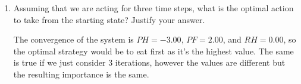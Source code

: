 \documentclass[12pt]{article}
\begin{document}
\begin{enumerate}
\item Assuming that we are acting for three time steps, what is the
  optimal action to take from the starting state? Justify your answer.

The convergence of the system is $PH = -3.00$, $PF = 2.00$, and $RH = 0.00$, so the optimal strategy would be to eat first as it's the highest value. The same is true if we just consider 3 iterations, however the values are different but the resulting importance is the same.
\end{enumerate}
\end{document}
